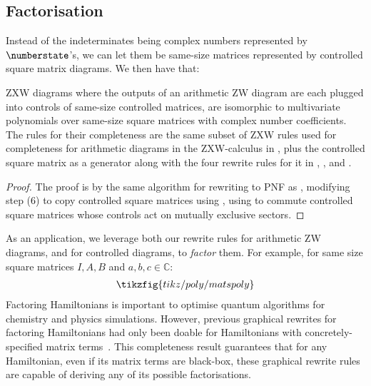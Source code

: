 \subsection{Factorisation}
Instead of the indeterminates being complex numbers represented by $\numberstate$'s, we can let them be same-size matrices represented by controlled square matrix diagrams.
We then have that:
\begin{thm}
    ZXW diagrams where the outputs of an arithmetic ZW diagram are each plugged into controls of same-size controlled matrices, are isomorphic to multivariate polynomials over same-size square matrices with complex number coefficients.
    The rules for their completeness are the same subset of ZXW rules used for completeness for arithmetic diagrams in the ZXW-calculus in , plus the controlled square matrix as a generator along with the four rewrite rules for it in , , and .
\end{thm}
\begin{proof}
    The proof is by the same algorithm for rewriting to PNF as , modifying step (6) to copy controlled square matrices using , using  to commute controlled square matrices whose controls act on mutually exclusive sectors.
\end{proof}

As an application, we leverage both our rewrite rules for arithmetic ZW diagrams, and for controlled diagrams, to \emph{factor} them.  For example, for same size square matrices $I, A, B$ and $a, b, c \in \mathbb{C}$:
\begin{gather*}
    \tikzfig{tikz/poly/matspoly}
\end{gather*}
Factoring Hamiltonians is important to optimise quantum algorithms for chemistry and physics simulations. However, previous graphical rewrites for factoring Hamiltonians had only been doable for Hamiltonians with concretely-specified matrix terms~\cite{shaikh2022sum}. This completeness result guarantees that for any Hamiltonian, even if its matrix terms are black-box, these graphical rewrite rules are capable of deriving any of its possible factorisations.